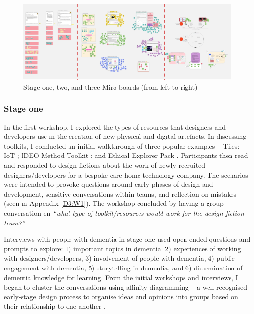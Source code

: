 \begin{figure}[htp]
\centering
\includegraphics[width=1\linewidth]{Images/D3Toolkit/Fig1.png}
\caption{Stage one, two, and three Miro boards (from left to right)}
\label{fig:StagesD3}
\end{figure}

\subsubsection{Stage one}
In the first workshop, I explored the types of resources that designers and developers use in the creation of new physical and digital artefacts. In discussing toolkits, I conducted an initial walkthrough of three popular examples – Tiles: IoT \citep{mora2017tiles}; IDEO Method Toolkit \citep{fraga2020inclusive}; and Ethical Explorer Pack \citep{network_ethical_nodate}. Participants then read and responded to design fictions about the work of newly recruited designers/developers for a bespoke care home technology company. The scenarios were intended to provoke questions around early phases of design and development, sensitive conversations within teams, and reflection on mistakes (seen in Appendix \ref{D3:W1}). The workshop concluded by having a group conversation on \textit{``what type of toolkit/resources would work for the design fiction team?''}

Interviews with people with dementia in stage one used open-ended questions and prompts to explore: 1) important topics in dementia, 2) experiences of working with designers/developers, 3) involvement of people with dementia, 4) public engagement with dementia, 5) storytelling in dementia, and 6) dissemination of dementia knowledge for learning. From the initial workshops and interviews, I began to cluster the conversations using affinity diagramming – a well-recognised early-stage design process to organise ideas and opinions into groups based on their relationship to one another \citep{lucero2015using}. 


